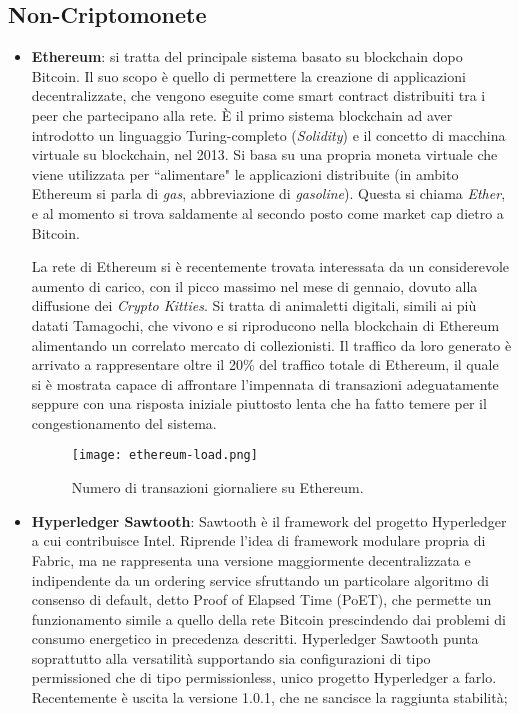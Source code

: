     \subsection{Non-Criptomonete} \label{sec:non-crypto}
        \begin{itemize}
            \item \textbf{Ethereum}: si tratta del principale sistema basato su blockchain dopo Bitcoin. Il suo scopo è quello di permettere la creazione di applicazioni decentralizzate, che vengono eseguite come smart contract distribuiti tra i peer che partecipano alla rete. È il primo sistema blockchain ad aver introdotto un linguaggio Turing-completo (\emph{Solidity}) e il concetto di macchina virtuale su blockchain, nel 2013. Si basa su una propria moneta virtuale che viene utilizzata per ``alimentare" le applicazioni distribuite (in ambito Ethereum si parla di \emph{gas}, abbreviazione di \emph{gasoline}). Questa si chiama \emph{Ether}, e al momento si trova saldamente al secondo posto come market cap dietro a Bitcoin.

            La rete di Ethereum si è recentemente trovata interessata da un considerevole aumento di carico, con il picco massimo nel mese di gennaio, dovuto alla diffusione dei \emph{Crypto Kitties}. Si tratta di animaletti digitali, simili ai più datati Tamagochi, che vivono e si riproducono nella blockchain di Ethereum alimentando un correlato mercato di collezionisti. Il traffico da loro generato è arrivato a rappresentare oltre il 20\% del traffico totale di Ethereum, il quale si è mostrata capace di affrontare l'impennata di transazioni adeguatamente seppure con una risposta iniziale piuttosto lenta che ha fatto temere per il congestionamento del sistema.

            \begin{figure}[ht]
                \centering
                \texttt{[image: ethereum-load.png]}
                \caption[Numero di transazioni giornaliere su Ethereum]{Numero di transazioni giornaliere su Ethereum.}
                \label{fig:ethereum-load}
            \end{figure}

            \item \textbf{Hyperledger Sawtooth}: Sawtooth è il framework del progetto Hyperledger a cui contribuisce Intel. Riprende l'idea di framework modulare propria di Fabric, ma ne rappresenta una versione maggiormente decentralizzata e indipendente da un ordering service sfruttando un particolare algoritmo di consenso di default, detto Proof of Elapsed Time (PoET), che permette un funzionamento simile a quello della rete Bitcoin prescindendo dai problemi di consumo energetico in precedenza descritti. Hyperledger Sawtooth punta soprattutto alla versatilità supportando sia configurazioni di tipo permissioned che di tipo permissionless, unico progetto Hyperledger a farlo. Recentemente è uscita la versione 1.0.1, che ne sancisce la raggiunta stabilità;


\end{itemize}
